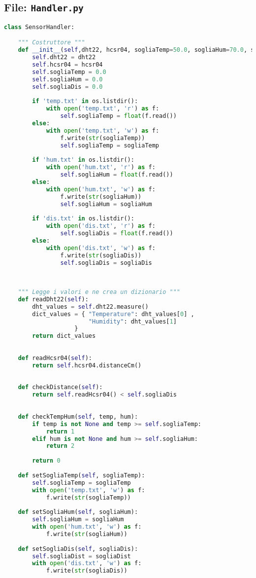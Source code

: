 \documentclass[12pt,a4paper]{article}
\begin{document}
	\subsection{File: \texttt{Handler.py}}
	\begin{lstlisting}[language=Python, caption={Questa classe gestisce la lettura del sensore ad ultrasuoni (hcsr04) e del sensore di umidità e temperatura (dht22) e il controllo che i valori letti siano minori di una certa soglia. Il costruttore inizializza le soglie con i valori imposti alla precedente esecuzione (leggendo da file) o tramite parametri di input. I metodi read() e check() permettono rispettivamente la lettura dei valori e il loro controllo. È inoltre possibile modificare le soglie tramite metodi set().}]
class SensorHandler:

	""" Costruttore """
	def __init__(self,dht22, hcsr04, sogliaTemp=50.0, sogliaHum=70.0, sogliaDis=10.0):
		self.dht22 = dht22
		self.hcsr04 = hcsr04
		self.sogliaTemp = 0.0
		self.sogliaHum = 0.0
		self.sogliaDis = 0.0
		
		if 'temp.txt' in os.listdir():
			with open('temp.txt', 'r') as f:
				self.sogliaTemp = float(f.read())
		else:
			with open('temp.txt', 'w') as f:
				f.write(str(sogliaTemp))
				self.sogliaTemp = sogliaTemp
		
		if 'hum.txt' in os.listdir():
			with open('hum.txt', 'r') as f:
				self.sogliaHum = float(f.read())
		else:
			with open('hum.txt', 'w') as f:
				f.write(str(sogliaHum))
				self.sogliaHum = sogliaHum
		
		if 'dis.txt' in os.listdir():
			with open('dis.txt', 'r') as f:
				self.sogliaDis = float(f.read())
		else:
			with open('dis.txt', 'w') as f:
				f.write(str(sogliaDis))
				self.sogliaDis = sogliaDis
	
	
	
	""" Legge i valori e ne crea un dizionario """
	def readDht22(self):
		dht_values = self.dht22.measure()
		dict_values = { "Temperature": dht_values[0] ,
						"Humidity": dht_values[1]
					}
		return dict_values
	
	
	def readHcsr04(self):
		return self.hcsr04.distanceCm()
	
	
	def checkDistance(self):
		return self.readHcsr04() < self.sogliaDis
	
	
	def checkTempHum(self, temp, hum):
		if temp is not None and temp >= self.sogliaTemp:
			return 1
		elif hum is not None and hum >= self.sogliaHum:
			return 2
	
		return 0
	
	def setSogliaTemp(self, sogliaTemp):
		self.sogliaTemp = sogliaTemp
		with open('temp.txt', 'w') as f:
			f.write(str(sogliaTemp))
	
	def setSogliaHum(self, sogliaHum):
		self.sogliaHum = sogliaHum
		with open('hum.txt', 'w') as f:
			f.write(str(sogliaHum))
	
	def setSogliaDis(self, sogliaDis):
		self.sogliaDist = sogliaDist
		with open('dis.txt', 'w') as f:
			f.write(str(sogliaDis))
	
	\end{lstlisting}
\end{document}
